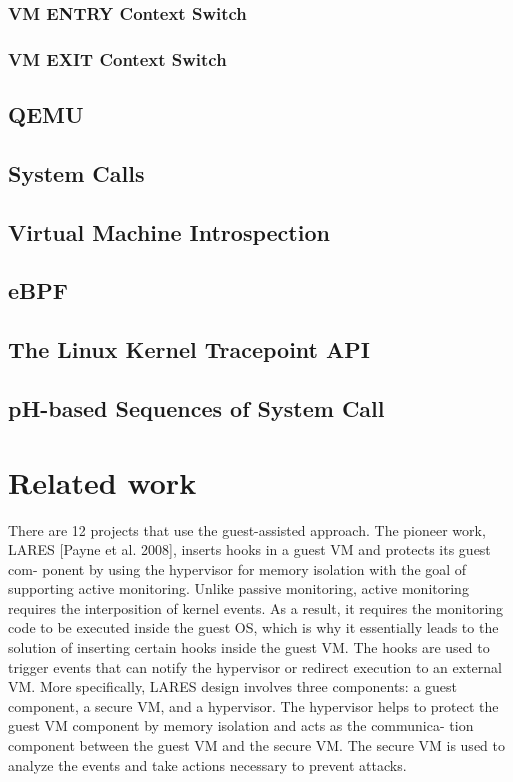 \documentclass{report}
\begin{document}
\begin{spacing}{1.5}
\subsection{VM ENTRY Context Switch}
\subsection{VM EXIT Context Switch}
\section{QEMU}
\section{System Calls}
\section{Virtual Machine Introspection}
\section{eBPF}
\section{The Linux Kernel Tracepoint API}
\section{pH-based Sequences of System Call}


\chapter{Related work}

{\large


There are 12 projects that use the guest-assisted approach. The pioneer
work, LARES [Payne et al. 2008], inserts hooks in a guest VM and protects its guest com-
ponent by using the hypervisor for memory isolation with the goal of supporting active
monitoring. Unlike passive monitoring, active monitoring requires the interposition of kernel events. As a result, it requires the monitoring code to be executed inside the guest OS, which is why it essentially leads to the solution of inserting certain hooks inside the guest VM. The hooks are used to trigger events that can notify the hypervisor
or redirect execution to an external VM. More specifically, LARES design involves three
components: a guest component, a secure VM, and a hypervisor. The hypervisor helps
to protect the guest VM component by memory isolation and acts as the communica-
tion component between the guest VM and the secure VM. The secure VM is used to
analyze the events and take actions necessary to prevent attacks.


}
\end{spacing}
\end{document}
